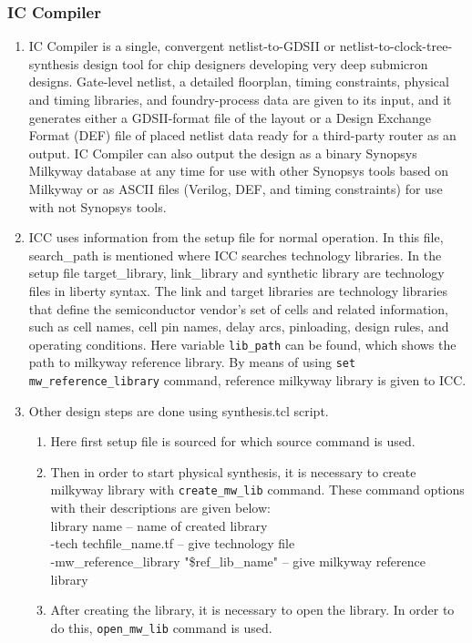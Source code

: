 \documentclass[a4paper,12pt,twoside]{article}
\begin{document}
\subsubsection{IC Compiler}
\begin{enumerate}
    \item IC Compiler is a single, convergent netlist-to-GDSII or netlist-to-clock-tree-synthesis design tool for chip designers developing very deep submicron designs. Gate-level netlist, a detailed floorplan, timing constraints, physical and timing libraries, and foundry-process data are given to its input, and it generates either a GDSII-format file of the layout or a Design Exchange Format (DEF) file of placed netlist data ready for a third-party router as an output. IC Compiler can also output the design as a binary Synopsys Milkyway database at any time for use with other Synopsys tools based on Milkyway or as ASCII files (Verilog, DEF, and timing constraints) for use with not Synopsys tools.
    \item ICC uses information from the setup file for normal operation. In this file, search\_path is mentioned where ICC searches technology libraries. In the setup file target\_library, link\_library and synthetic library are technology files in liberty syntax. The link and target libraries are technology libraries that define the semiconductor vendor’s set of cells and related information, such as cell names, cell pin names, delay arcs, pinloading, design rules, and operating conditions. Here variable \texttt{lib\_path} can be found, which shows the path to milkyway reference library. By means of using \texttt{set mw\_reference\_library} command, reference milkyway library is given to ICC.
    \item Other design steps are done using synthesis.tcl script.
    \begin{enumerate}
        \item Here first setup file is sourced for which source command is used.
        \item Then in order to start physical synthesis, it is necessary to create milkyway library with \texttt{create\_mw\_lib} command. These command options with their descriptions are given below:\\
        library name – name of created library\\
        -tech techfile\_name.tf – give technology file\\
        -mw\_reference\_library "\$ref\_lib\_name" – give milkyway reference library
        \item After creating the library, it is necessary to open the library. In order to do this, \texttt{open\_mw\_lib} command is used.

\end{enumerate}
\end{enumerate}
\end{document}
